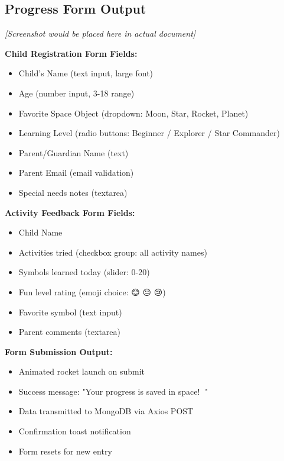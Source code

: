 \documentclass[12pt, a4paper]{article}
\begin{document}
\subsection{Progress Form Output}

\begin{tcolorbox}[colback=gray!5, colframe=gray!50, title=\textbf{Progress Tracking Forms}]
\textit{[Screenshot would be placed here in actual document]}

\textbf{Child Registration Form Fields:}
\begin{itemize}
    \item Child's Name (text input, large font)
    \item Age (number input, 3-18 range)
    \item Favorite Space Object (dropdown: Moon, Star, Rocket, Planet)
    \item Learning Level (radio buttons: Beginner / Explorer / Star Commander)
    \item Parent/Guardian Name (text)
    \item Parent Email (email validation)
    \item Special needs notes (textarea)
\end{itemize}

\textbf{Activity Feedback Form Fields:}
\begin{itemize}
    \item Child Name
    \item Activities tried (checkbox group: all activity names)
    \item Symbols learned today (slider: 0-20)
    \item Fun level rating (emoji choice: 😊 😐 😢)
    \item Favorite symbol (text input)
    \item Parent comments (textarea)
\end{itemize}

\textbf{Form Submission Output:}
\begin{itemize}
    \item Animated rocket launch on submit
    \item Success message: "Your progress is saved in space! 🚀"
    \item Data transmitted to MongoDB via Axios POST
    \item Confirmation toast notification
    \item Form resets for new entry
\end{itemize}
\end{tcolorbox}
\end{document}

